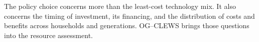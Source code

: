 \par
The policy choice concerns more than the least-cost technology mix. It also concerns
the timing of investment, its financing, and the distribution of costs and benefits
across households and generations. OG--CLEWS brings those questions into the resource
assessment.
